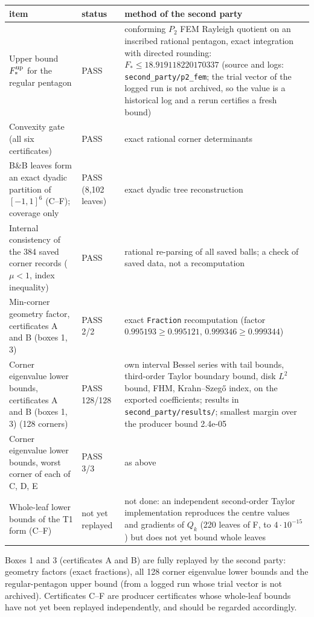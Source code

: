 \documentclass[11pt]{article}
\theoremstyle{remark}
\begin{document}
\begin{center}\small
\begin{tabular}{p{6.2cm}p{3.2cm}p{5.4cm}}
\toprule
item & status & method of the second party\\
\midrule
Upper bound $F_*^{\rm up}$ for the regular pentagon & PASS & conforming $P_2$ FEM Rayleigh quotient on an inscribed rational pentagon, exact integration with directed rounding: $F_*\le18.919118220170337$ (source and logs: \texttt{second\_party/p2\_fem}; the trial vector of the logged run is not archived, so the value is a historical log and a rerun certifies a fresh bound)\\
Convexity gate (all six certificates) & PASS & exact rational corner determinants\\
B\&B leaves form an exact dyadic partition of $[-1,1]^6$ (C--F); coverage only & PASS (8{,}102 leaves) & exact dyadic tree reconstruction\\
Internal consistency of the 384 saved corner records ($\mu<1$, index inequality) & PASS & rational re-parsing of all saved balls; a check of saved data, not a recomputation\\
Min-corner geometry factor, certificates A and B (boxes 1, 3) & PASS 2/2 & exact \texttt{Fraction} recomputation (factor $0.995193\ge0.995121$, $0.999346\ge0.999344$)\\
Corner eigenvalue lower bounds, certificates A and B (boxes 1, 3) (128 corners) & PASS 128/128 & own interval Bessel series with tail bounds, third-order Taylor boundary bound, disk $L^2$ bound, FHM, Krahn--Szeg\H{o} index, on the exported coefficients; results in \texttt{second\_party/results/}; smallest margin over the producer bound 2.4e-05\\
Corner eigenvalue lower bounds, worst corner of each of C, D, E & PASS 3/3 & as above\\
Whole-leaf lower bounds of the T1 form (C--F) & not yet replayed & not done: an independent second-order Taylor implementation reproduces the centre values and gradients of $Q_k$ (220 leaves of F, to $4\cdot10^{-15}$) but does not yet bound whole leaves\\
\bottomrule
\end{tabular}
\end{center}

Boxes 1 and 3 (certificates A and B) are fully replayed by the second party: geometry factors (exact fractions), all 128 corner eigenvalue lower bounds and the regular-pentagon upper bound (from a logged run whose trial vector is not archived). Certificates C--F are producer certificates whose whole-leaf bounds have not yet been replayed independently, and should be regarded accordingly.
\end{document}
